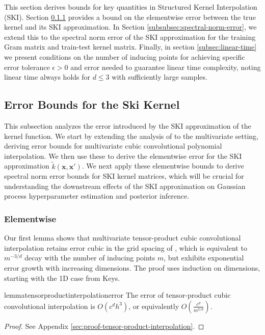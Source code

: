 

This section derives bounds for key quantities in Structured Kernel Interpolation (SKI). Section \ref{subsubsec:elementwise-error} provides a bound on the elementwise error between the true kernel and its SKI approximation. In Section \ref{subsubsec:spectral-norm-error}, we extend this to the spectral norm error of the SKI approximation for the training Gram matrix and train-test kernel matrix. Finally, in section \ref{subsec:linear-time} we present conditions on the number of inducing points for achieving specific error tolerance $\epsilon>0$ and error needed to guarantee linear time complexity, noting linear time always holds for $d\leq 3$ with sufficiently large samples.


\subsection{Error Bounds for the Ski Kernel}\label{subsec:ski-kernel-error-bounds}
This subsection analyzes the error introduced by the SKI approximation of the kernel function. We start by extending the analysis of \cite{keys1981cubic} to the multivariate setting, deriving error bounds for multivariate cubic convolutional polynomial interpolation. We then use these to derive the elementwise error for the SKI approximation \(\tilde{k}(\textbf{x},\textbf{x}')\). We next apply these elementwise bounds to derive spectral norm error bounds for SKI kernel matrices, which will be crucial for understanding the downstream effects of the SKI approximation on Gaussian process hyperparameter estimation and posterior inference.


\subsubsection{Elementwise}\label{subsubsec:elementwise-error}


Our first lemma shows that multivariate tensor-product cubic convolutional interpolation retains error cubic in the grid spacing of \cite{keys1981cubic}, which is equivalent to $m^{-3/d}$ decay with the number of inducing points $m$, but exhibits exponential error growth with increasing dimensions. The proof uses induction on dimensions, starting with the 1D case from Keys.

\begin{restatable}{lemma}{tensorproductinterpolationerror}\label{lemma:tensor-product-interpolation-error}
The error of tensor-product cubic convolutional interpolation is $O(c^d h^3)$, or equivalently $O\left(\frac{c^d}{m^{3/d}}\right)$.
\end{restatable}
\begin{proof}
    See Appendix \ref{sec:proof-tensor-product-interpolation}.
\end{proof}


